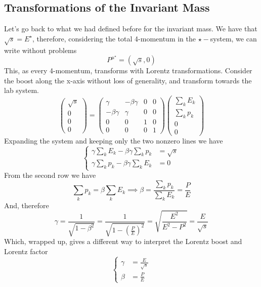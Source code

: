 \documentclass[../admech.tex]{subfiles}
\begin{document}
\subsection{Transformations of the Invariant Mass}
Let's go back to what we had defined before for the invariant mass. We have that $\sqrt{s}=E^\star$, therefore, considering the total 4-momentum in the $\star-$system, we can write without problems
\begin{equation}
	P^{\mu^\star}=\left( \sqrt{s},0 \right)
	\label{eq:totalstarmom}
\end{equation}
This, as every 4-momentum, transforms with Lorentz transformations. Consider the boost along the x-axis without loss of generality, and transform towards the lab system.
\begin{equation}
	\begin{pmatrix}
		\sqrt{s}\\0\\0\\0
	\end{pmatrix}=\begin{pmatrix}
		\gamma&-\beta\gamma&0&0\\
		-\beta\gamma&\gamma&0&0\\
		0&0&1&0\\
		0&0&0&1
	\end{pmatrix}\begin{pmatrix}
		\sum_kE_k\\
		\sum_kp_k\\
		0\\
		0
	\end{pmatrix}
	\label{eq:rootslorentz}
\end{equation}
Expanding the system and keeping only the two nonzero lines we have
\begin{equation}
	\left\{ \begin{aligned}
			\gamma\sum_kE_k-\beta\gamma\sum_kp_k&=\sqrt{s}\\
			\gamma\sum_kp_k-\beta\gamma\sum_kE_k&=0
	\end{aligned}\right.
	\label{eq:rootslor}
\end{equation}
From the second row we have
\begin{equation}
	\sum_kp_k=\beta\sum_kE_k\implies\beta=\frac{\sum_kp_k}{\sum_kE_k}=\frac{P}{E}
	\label{eq:betanewform}
\end{equation}
And, therefore
\begin{equation}
	\gamma=\frac{1}{\sqrt{1-\beta^2}}=\frac{1}{\sqrt{1-\left( \frac{P}{E} \right)^2}}=\sqrt{\frac{E^2}{E^2-P^2}}=\frac{E}{\sqrt{s}}
	\label{eq:gammaroots}
\end{equation}
Which, wrapped up, gives a different way to interpret the Lorentz boost and Lorentz factor
\begin{equation}
	\left\{ \begin{aligned}
			\gamma&=\frac{E}{\sqrt{s}}\\
			\beta&=\frac{P}{E}
	\end{aligned}\right.
	\label{eq:gammabetaroots}
\end{equation}
\end{document}
